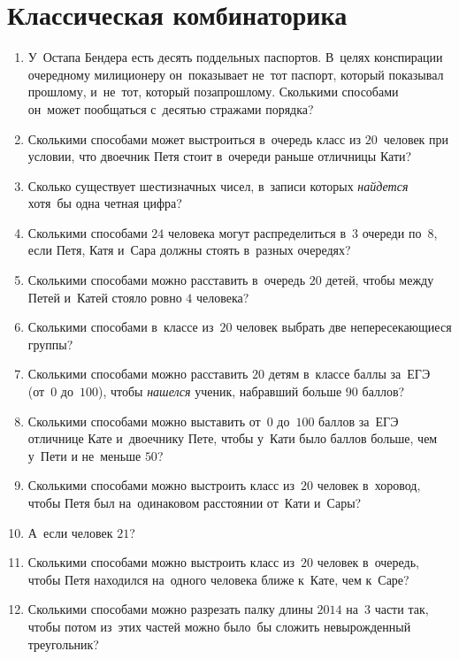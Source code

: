
\section*{Классическая комбинаторика}


\begin{enumerate}

\item
У~Остапа Бендера есть десять поддельных паспортов.
В~целях конспирации очередному милиционеру он~показывает не~тот паспорт,
который показывал прошлому, и~не~тот, который позапрошлому.
Сколькими способами он~может пообщаться с~десятью стражами порядка?

\item
Сколькими способами может выстроиться в~очередь класс из $20$~человек при
условии, что двоечник Петя стоит в~очереди раньше отличницы Кати?

\item
Сколько существует шестизначных чисел, в~записи которых \emph{найдется}
хотя~бы одна четная цифра?

\item
Сколькими способами $24$ человека могут распределиться в~$3$ очереди по~$8$,
если Петя, Катя и~Сара должны стоять в~разных очередях?

\item
Сколькими способами можно расставить в~очередь $20$ детей, чтобы между Петей
и~Катей стояло ровно $4$ человека?

\item
Сколькими способами в~классе из~$20$ человек выбрать две непересекающиеся
группы?

\item
Сколькими способами можно расставить $20$ детям в~классе баллы за~ЕГЭ
(от~$0$ до~$100$), чтобы \emph{нашелся} ученик, набравший больше $90$ баллов?

\item
Сколькими способами можно выставить от~$0$ до~$100$ баллов за~ЕГЭ отличнице
Кате и~двоечнику Пете, чтобы у~Кати было баллов больше, чем у~Пети и
не~меньше $50$?

\item
Сколькими способами можно выстроить класс из~$20$ человек в~хоровод, чтобы Петя
был на~одинаковом расстоянии от~Кати и~Сары?

\item
А~если человек $21$?

\item
Сколькими способами можно выстроить класс из~$20$ человек в~очередь, чтобы Петя
находился на~одного человека ближе к~Кате, чем к~Саре?

\item
Сколькими способами можно разрезать палку длины $2014$ на~$3$ части так, чтобы
потом из~этих частей можно было~бы сложить невырожденный треугольник?

\end{enumerate}

